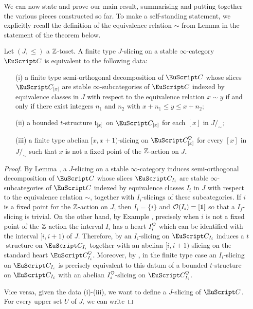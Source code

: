 {We can now state and prove our main result, summarising and putting together the various pieces constructed so far. To make a self-standing statement, we explicitly recall the definition of the equivalence relation $\sim$ from Lemma  in the statement of the theorem below.
\begin{theorem}\label{conclusion}
Let $(J,\leq)$ a $\mathbb{Z}$-toset. A finite type $J$-slicing on a stable $\infty$-category $\C$ is equivalent to the following data:
\begin{enumerate}
\item[(i)] a finite type semi-orthogonal decomposition of $\C$ whose slices $\C_{[x]}$ are stable  $\infty$-subcategories of $\C$ indexed by equivalence classes in $J$ with respect to the equivalence relation $x\sim y$ if and only if there exist integers $n_1$ and $n_2$ with $x+n_1\leq y\leq x+n_2$;
\item[(ii)] a bounded $t$-structure $\mathfrak{t}_{[x]}$ on $\C_{[x]}$ for each  $[x]$ in $J/_{\!\sim}$;
\item[(iii)] a finite type abelian $[x,x+1)$-slicing on $\C_{[x]}^\heart$ for every $[x]$ in $J/_{\!\sim}$ such that $x$ is not a fixed point of the $\mathbb{Z}$-action on $J$.
\end{enumerate}
\end{theorem}
\begin{proof}
By Lemma , a $J$-slicing on a stable $\infty$-category induces semi-orthogonal decomposition of $\C$ whose slices $\C_{I_i}$ are stable  $\infty$-subcategories of $\C$ indexed by equivalence classes $I_i$ in $J$ with respect to the equivalence relation $\sim$, together with $I_i$-slicings of these subcategories.
If $i$ is a fixed point for the $\mathbb{Z}$-action on $J$, then $I_i=\{i\}$ and $\mathcal{O}(I_i)=[\mathbf{1}]$ so that a $I_j$-slicing is trivial. On the other hand, by Example , precisely when $i$ is not a fixed point of the $\mathbb{Z}$-action the interval $I_i$ has a heart $I_i^\heart$ which can be identified with the interval $[i,i+1)$ of $J$. Therefore, by \aprop{} an $I_i$-slicing on $\C_{I_i}$ induces a $t$-structure on $\C_{I_i}$ together with an abelian $[i,i+1)$-slicing on the standard heart $\C_{I_i}^\heart$. Moreover, by \aprop{}, in the finite type case an $I_i$-slicing on $\C_{I_i}$ is precisely equivalent to this datum of a bounded $t$-structure on $\C_{I_i}$ with an abelian $I_i^\heart$-slicing on $\C_{I_i}^\heart$. 
\par
Vice versa, given the data (i)-(iii), we want to define a $J$-slicing of $\C$. For every upper set $U$ of $J$, we can write 

\end{proof}}

